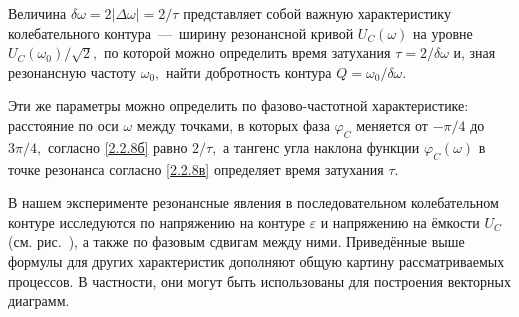 Величина $\delta\omega=2|\Delta\omega|=2/\tau$ представляет собой важную характеристику колебательного контура~---~ширину резонансной кривой $U_C(\omega)$ на уровне $U_C(\omega_0)/\sqrt{2},$ по которой можно определить время затухания $\tau=2/\delta\omega$ и, зная резонансную частоту $\omega_0,$ найти добротность контура $Q=\omega_0/\delta\omega.$

Эти же параметры можно определить по фазово-частотной характеристике: расстояние по оси $\omega$ между точками, в которых фаза $\varphi_C$ меняется от $-\pi/4$ до $3\pi/4,$ согласно \eqref{2.2.8б} равно $2/\tau,$ а тангенс угла наклона функции $\varphi_C(\omega)$ в точке резонанса согласно \eqref{2.2.8в} определяет время затухания $\tau.$

В нашем эксперименте резонансные явления в последовательном колебательном контуре исследуются по напряжению на контуре $\varepsilon$ и напряжению на ёмкости $U_C$ (см. рис.~), а также по фазовым сдвигам между ними. Приведённые выше формулы для других характеристик дополняют общую картину рассматриваемых процессов. В частности, они могут быть использованы для построения векторных диаграмм.

